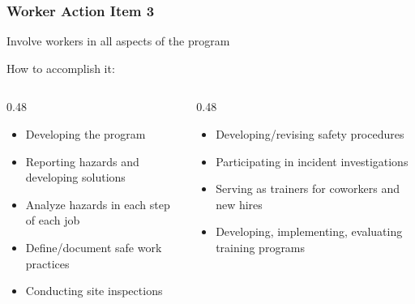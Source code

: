 \begin{frame}
    \frametitle{Worker Action Item 3}

    Involve workers in all aspects of the program

    \begin{block}{How to accomplish it:}
        \vspace{-1.5em}
        \begin{columns}[t]
            \begin{column}{0.48\linewidth}
                \begin{itemize}
                    \item Developing the program
                    \item Reporting hazards and developing solutions
                    \item Analyze hazards in each step of each job
                    \item Define/document safe work practices
                    \item Conducting site inspections
                \end{itemize}
            \end{column}
            \begin{column}{0.48\linewidth}
                \begin{itemize}                    
                    \item Developing/revising safety procedures
                    \item Participating in incident investigations
                    \item Serving as trainers for coworkers and new hires
                    \item Developing, implementing, evaluating training programs
                \end{itemize}
            \end{column}
        \end{columns}    
    \end{block}
\end{frame}

